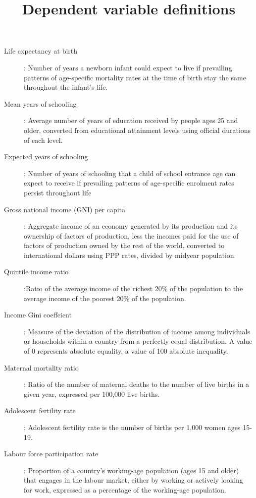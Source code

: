 \title{Dependent variable definitions}
\begin{description}
\item[Life expectancy at birth]: Number of years a newborn infant could expect to live if prevailing patterns of age-specific mortality rates at the time of birth stay the same throughout the infant’s life.
\item[Mean years of schooling]: Average number of years of education received by people ages 25 and older, converted from educational attainment levels using official durations of each level.
\item[Expected years of schooling]: Number of years of schooling that a child of school entrance age can expect to receive if prevailing patterns of age-specific enrolment rates persist throughout life
\item[Gross national income (GNI) per capita]: Aggregate income of an economy generated by its production and its ownership of factors of production, less the incomes paid for the use of factors of production owned by the rest of the world, converted to international dollars using PPP rates, divided by midyear population.
\item[Quintile income ratio]:Ratio of the average income of the richest 20\% of the population to the average income of the poorest 20\% of the population.
\item[Income Gini coeffcient]: Measure of the deviation of the distribution of income among individuals or households within a country from a perfectly equal distribution. A value of 0 represents absolute equality, a value of 100 absolute inequality.
\item[Maternal mortality ratio]: Ratio of the number of maternal deaths to the number of live births in a given year, expressed per 100,000 live births.
\item[Adolescent fertility rate]: Adolescent fertility rate is the number of births per 1,000 women ages 15-19.
\item[Labour force participation rate]: Proportion of a country’s working-age population (ages 15 and older) that engages in the labour market, either by working or actively looking for work, expressed as a percentage of the working-age population.
\end{description}